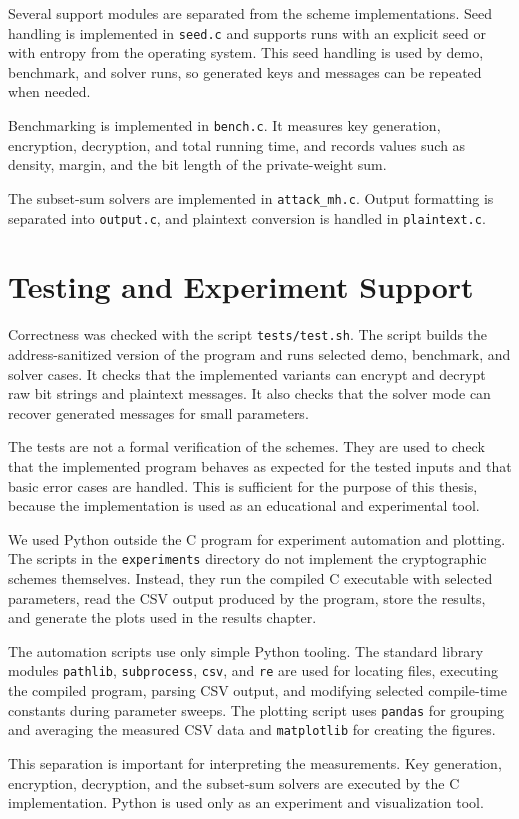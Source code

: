 Several support modules are separated from the scheme implementations. Seed
handling is implemented in \texttt{seed.c} and supports runs with an explicit
seed or with entropy from the operating system. This seed handling is used by demo, benchmark, and solver
runs, so generated keys and messages can be repeated when needed.

Benchmarking is implemented in \texttt{bench.c}. It measures key generation,
encryption, decryption, and total running time, and records values such as
density, margin, and the bit length of the private-weight sum.

The subset-sum solvers are implemented in \texttt{attack\_mh.c}. Output
formatting is separated into \texttt{output.c}, and plaintext conversion is
handled in \texttt{plaintext.c}.

\section{Testing and Experiment Support}

Correctness was checked with the script \texttt{tests/test.sh}. The script
builds the address-sanitized version of the program and runs selected demo,
benchmark, and solver cases. It checks that the implemented variants can
encrypt and decrypt raw bit strings and plaintext messages. It also checks that
the solver mode can recover generated messages for small parameters.

The tests are not a formal verification of the schemes. They are used to check
that the implemented program behaves as expected for the tested inputs and that
basic error cases are handled. This is sufficient for the purpose of this
thesis, because the implementation is used as an educational and experimental
tool.

We used Python outside the C program for experiment automation and plotting.
The scripts in the \texttt{experiments} directory do not implement the
cryptographic schemes themselves. Instead, they run the compiled C executable
with selected parameters, read the CSV output produced by the program, store the
results, and generate the plots used in the results chapter.

The automation scripts use only simple Python tooling. The standard library
modules \texttt{pathlib}, \texttt{subprocess}, \texttt{csv}, and \texttt{re}
are used for locating files, executing the compiled program, parsing CSV output,
and modifying selected compile-time constants during parameter sweeps. The
plotting script uses \texttt{pandas} for grouping and averaging the measured CSV
data and \texttt{matplotlib} for creating the figures.

This separation is important for interpreting the measurements. Key generation,
encryption, decryption, and the subset-sum solvers are executed by the C
implementation. Python is used only as an experiment and visualization
tool. 
